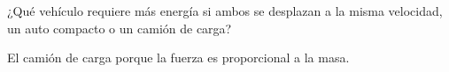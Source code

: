 ¿Qué vehículo requiere más energía si ambos se desplazan a la misma velocidad,
un auto compacto o un camión de carga?

\begin{solutionbox}{2cm}
    El camión de carga porque la fuerza es proporcional a la masa.
\end{solutionbox}

